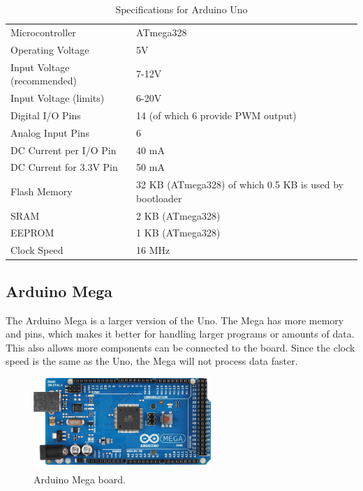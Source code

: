 \begin{table}
\begin{tabular}{| l | l |}
\hline
Microcontroller & ATmega328\\
Operating Voltage & 5V\\
Input Voltage (recommended) & 7-12V\\
Input Voltage (limits) & 6-20V\\
Digital I/O Pins & 14 (of which 6 provide PWM output)\\
Analog Input Pins & 6\\
DC Current per I/O Pin & 40 mA\\
DC Current for 3.3V Pin & 50 mA\\
Flash Memory & 32 KB (ATmega328) of which 0.5 KB is used by bootloader\\
SRAM & 2 KB (ATmega328)\\
EEPROM & 1 KB (ATmega328)\\
Clock Speed & 16 MHz\\
\hline
\end{tabular}
\caption{Specifications for Arduino Uno}
\end{table}
\label{tab:unospec}


\subsection{Arduino Mega}
The Arduino Mega is a larger version of the Uno. The Mega has more memory and pins, which makes it better for handling larger programs or amounts of data. This also allows more components can be connected to the board. Since the clock speed is the same as the Uno, the Mega will not process data faster.

\begin{figure}[h!]
\centering
\includegraphics[width=0.6\textwidth]{chapters/analysis/figs/ArduinoMega.jpg}
\caption{Arduino Mega board\cite{arduinomegaimg}.}
\label{fig:arduinomega}
\end{figure}

